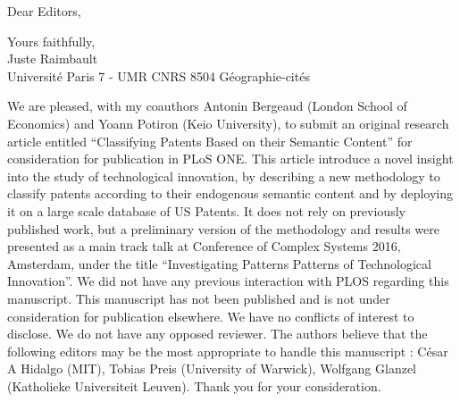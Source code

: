 \documentclass[11pt,a4paper,sans]{moderncv}        %
\begin{document}




\date{December 26, 2016}
\opening{Dear Editors,}
\closing{Yours faithfully,\\
Juste Raimbault\\
Université Paris 7 - UMR CNRS 8504 Géographie-cités
}
\makelettertitle

\justify
We are pleased, with my coauthors Antonin Bergeaud (London School of Economics) and Yoann Potiron (Keio University), to submit an original research article entitled ``Classifying Patents Based on their Semantic Content'' for consideration for publication in PLoS ONE. This article introduce a novel insight into the study of technological innovation, by describing a new methodology to classify patents according to their endogenous semantic content and by deploying it on a large scale database of US Patents. It does not rely on previously published work, but a preliminary version of the methodology and results were presented as a main track talk at Conference of Complex Systems 2016, Amsterdam, under the title ``Investigating Patterns Patterns of Technological Innovation''. We did not have any previous interaction with PLOS regarding this manuscript.
This manuscript has not been published and is not under consideration for publication elsewhere. We
have no conflicts of interest to disclose. We do not have any opposed reviewer. The authors believe that the following editors may be the most appropriate to handle this manuscript : César A Hidalgo (MIT), Tobias Preis (University of Warwick), Wolfgang Glanzel (Katholieke Universiteit Leuven).
Thank you for your consideration.
\justify

\end{document}
